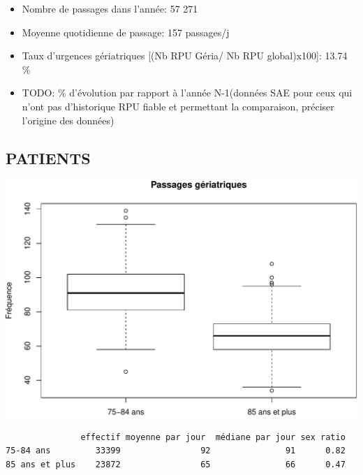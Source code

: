 \documentclass[]{article}
\begin{document}
\begin{itemize}
\itemsep1pt\parskip0pt
\item
  Nombre de passages dans l'année: 57 271
\item
  Moyenne quotidienne de passage: 157 passages/j
\item
  Taux d'urgences gériatriques {[}(Nb RPU Géria/ Nb RPU global)x100{]}:
  13.74 \%
\item
  TODO: \% d'évolution par rapport à l'année N-1(données SAE pour ceux
  qui n'ont pas d'historique RPU fiable et permettant la comparaison,
  préciser l'origine des données)
\end{itemize}

\subsection{PATIENTS}\label{patients-2}

\includegraphics{rapport2014_V4_files/figure-latex/sexe75-1.pdf}

\begin{verbatim}
               effectif moyenne par jour  médiane par jour sex ratio
75-84 ans         33399                92               91      0.82
85 ans et plus    23872                65               66      0.47
\end{verbatim}
\end{document}
